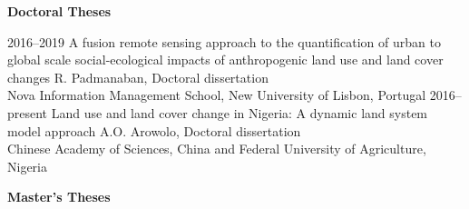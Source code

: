 \documentclass[]{friggeri-cv} %
\begin{document}
\textbf{Doctoral Theses}

\begin{entrylist}
\entry
{\small{2016--2019}}
{A fusion remote sensing approach to the quantification of urban to global scale social-ecological impacts of anthropogenic land use and land cover changes}
{}
{R. Padmanaban, Doctoral dissertation \\
Nova Information Management School, New University of Lisbon, Portugal}
\entry
{\small{2016--present}}
{Land use and land cover change in Nigeria: A dynamic land system model approach}
{}
{A.O. Arowolo, Doctoral dissertation \\
Chinese Academy of Sciences, China and Federal University of Agriculture, Nigeria}
\end{entrylist}

\vspace{-0.3cm}
\textbf{Master's Theses}
\end{document}
